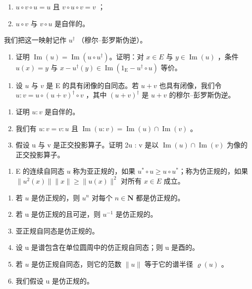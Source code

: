 \begin{enumerate}
\def\labelenumi{(\roman{enumi})}
\item
  \(u \circ v \circ u = u\) 且 \(v \circ u \circ v = v\) ；
\item
  \(u \circ v\) 与 \(v \circ u\) 是自伴的。
\end{enumerate}

我们把这一映射记作 \(u^{\dagger}\) （穆尔–彭罗斯伪逆）。

\begin{enumerate}
\def\labelenumi{\alph{enumi})}
\setcounter{enumi}{1}
\tightlist
\item
  证明 \(\operatorname{Im}(u) = \operatorname{Im}(u \circ u^{\dagger})\)。证明：对 \(x \in E\) 与 \(y \in \operatorname{Im}(u)\) ，条件 \(u(x) = y\) 与 \(x - u^{\dagger}(y) \in \operatorname{Im}(1_{\operatorname{E}} - u^{\dagger} \circ u)\) 等价。
\end{enumerate}

\begin{enumerate}
\def\labelenumi{\arabic{enumi})}
\setcounter{enumi}{8}
\tightlist
\item
  设 \(u\) 与 \(v\) 是 E 的具有闭像的自同态。若 \(u + v\) 也具有闭像，我们令 \(u: v = u \circ (u + v)^{\dagger} \circ v\) ，其中 \((u + v)^{\dagger}\) 是 \(u + v\) 的穆尔–彭罗斯伪逆。
\end{enumerate}

\begin{enumerate}
\def\labelenumi{\alph{enumi})}
\item
  证明 \(u:v\) 是自伴的。
\item
  我们有 \(u:v=v:u\) 且 \(\operatorname{Im}(u:v)=\operatorname{Im}(u)\cap\operatorname{Im}(v)\) 。
\item
  假设 u 与 v 是正交投影算子。证明 2u : v 是以 \(\operatorname{Im}(u) \cap \operatorname{Im}(v)\) 为像的正交投影算子。
\end{enumerate}

\begin{enumerate}
\def\labelenumi{\arabic{enumi})}
\setcounter{enumi}{9}
\tightlist
\item
  E 的连续自同态 \(u\) 称为亚正规的，如果 \(u^{*} \circ u \geqslant u \circ u^{*}\)；称为仿正规的，如果 \(\|u^{2}(x)\|\|x\| \geqslant \|u(x)\|^{2}\) 对所有 \(x \in E\) 成立。
\end{enumerate}

\begin{enumerate}
\def\labelenumi{\alph{enumi})}
\item
  若 \(u\) 是仿正规的，则 \(u^n\) 对每个 \(n \in \mathbf{N}\) 都是仿正规的。
\item
  若 u 是仿正规的且可逆，则 \(u^{-1}\) 是仿正规的。
\item
  亚正规自同态是仿正规的。
\item
  设 u 是谱包含在单位圆周中的仿正规自同态；则 u 是酉的。
\item
  若 \(u\) 是仿正规自同态，则它的范数 \(\| u\|\) 等于它的谱半径 \(\varrho(u)\) 。
\item
  我们假设 u 是仿正规的。
\end{enumerate}

